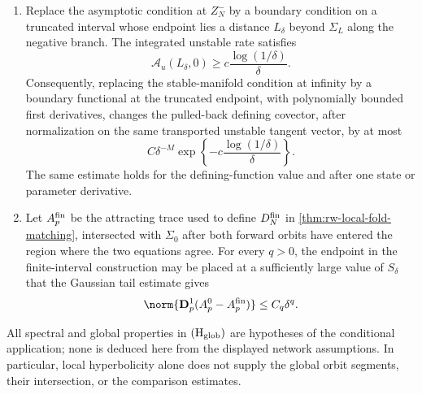 \begin{assumption}
\begin{enumerate}[label=\textup{(\roman*)}]
\item Replace the asymptotic condition at \(Z_N^-\) by a boundary condition
on a truncated interval whose endpoint lies a distance \(L_\delta\) beyond
\(\Sigma_L\) along the negative branch.  The integrated unstable
rate
satisfies
\begin{equation}
 \mathcal A_u(L_\delta,0)
 \ge c\frac{\log(1/\delta)}{\delta}.
 \label{eq:supp-integrated-unstable-rate}
\end{equation}
Consequently, replacing the stable-manifold condition at infinity by a
boundary functional at the truncated endpoint, with polynomially bounded
first derivatives, changes the
pulled-back defining covector, after normalization on the same transported
unstable tangent vector, by at most
\begin{equation}
 C\delta^{-M}
 \exp\left\{-c\frac{\log(1/\delta)}{\delta}\right\}.
 \label{eq:supp-terminal-decay}
\end{equation}
The same estimate holds for the defining-function value and after one
state or parameter derivative.

\item Let \(A_p^{\rm fin}\) be the attracting trace used to define
\(D_N^{\rm fin}\) in \cref{thm:rw-local-fold-matching}, intersected with
\(\Sigma_0\) after both forward orbits have entered the region where the
two equations agree.  For every \(q>0\), the endpoint in the
finite-interval construction may be placed at a sufficiently large value of
\(S_\delta\) that the Gaussian tail estimate gives
\begin{equation}
 \norm{\mathbf D_p^1(A_p^0-A_p^{\rm fin})}
 \le C_q\delta^q.
 \label{eq:supp-positive-history-comparison}
\end{equation}
\end{enumerate}
\end{assumption}

All spectral and global properties in \(\mathrm{(H_{\rm glob})}\) are
hypotheses of the conditional application; none is deduced here from the
displayed network assumptions.  In particular, local hyperbolicity alone
does not supply the global orbit segments, their intersection, or the
comparison estimates.

